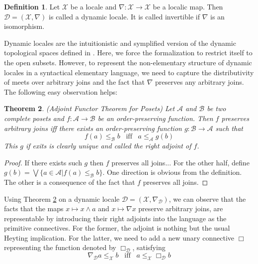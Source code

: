 \documentclass[12pt,a4paper]{article}
\theoremstyle{plain}
\newtheorem{thm}{Theorem}[section]
\theoremstyle{definition}
\newtheorem{dfn}[thm]{Definition}
\begin{document}
\begin{dfn}
Let $\mathscr{X}$ be a locale and $\nabla: \mathscr{X} \to \mathscr{X}$ be a localic map. Then $\mathcal{D}=(\mathscr{X}, \nabla)$ is called a dynamic locale. It is called invertible if $\nabla$ is an isomorphism.
\end{dfn}

Dynamic locales are the intuitionistic and symplified version of the dynamic topological spaces defined in \cite{}. Here, we force the formalization to restrict itself to the open subsets. However, to represent the non-elementary structure of dynamic locales in a syntactical elementary language, we need to capture the distributivity of meets over arbitrary joins and the fact that $\nabla$ preserves any arbitrary joins. The following easy observation helps:

\begin{thm}(Adjoint Functor Theorem for Posets) \label{AFT}
Let $\mathcal{A}$ and $\mathcal{B}$ be two complete posets and $f:\mathcal{A} \to \mathcal{B}$ be an order-preserving function. Then $f$ preserves arbitrary joins iff there exists an order-preserving function $g: \mathcal{B} \to \mathcal{A}$ such that 
\[
f(a) \leq_{\mathcal{B}} b  \;\;\; \text{iff}  \;\;\; a \leq_{\mathcal{A}} g(b)
\]
This $g$ if exits is clearly unique and called the right adjoint of $f$.
\end{thm}
\begin{proof}
If there exists such $g$ then $f$ preserves all joins... For the other half, define $g(b)=\bigvee \{a \in \mathcal{A} | f(a) \leq_{\mathcal{B}} b \}$. One direction is obvious from the definition. The other is a consequence of the fact that $f$ preserves all joins.
\end{proof}

Using Theorem \ref{AFT} on a dynamic locale $\mathcal{D}=(\mathscr{X}, \nabla_{\mathcal{D}})$, we can observe that the facts that the maps $x \mapsto x \wedge a$ and $x \mapsto \nabla x$ preserve arbitrary joins, are representable by introducing their right adjoints into the language as the primitive connectives. For the former, the adjoint is nothing but the usual Heyting implication. For the latter, we need to add a new unary connective $\Box$ representing the function denoted by $\Box_{\mathcal{D}}$, satisfying
\[
\nabla_{\mathcal{D}} a \leq_{\mathscr{X}} b  \;\;\; \text{iff}  \;\;\; a \leq_{\mathscr{X}} \Box_{\mathcal{D}} b
\]
\end{document}
